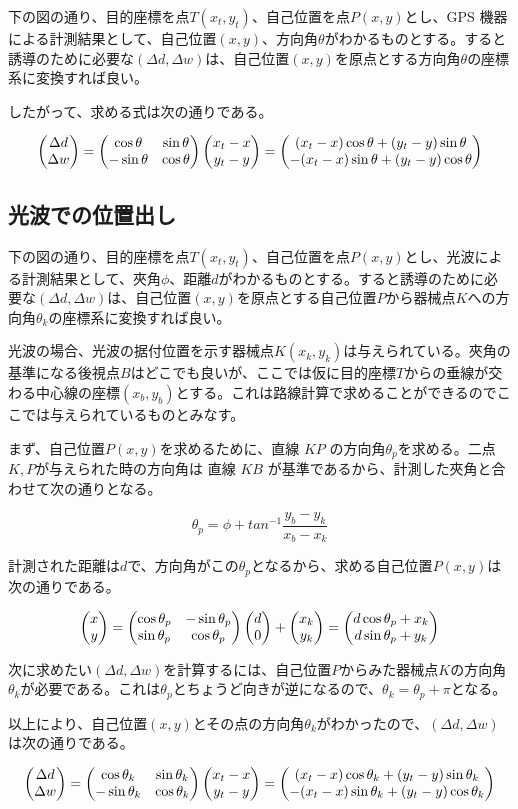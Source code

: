 下の図の通り、目的座標を点\(T(x_t, y_t)\)、自己位置を点\(P(x, y)\)とし、GPS
機器による計測結果として、自己位置\((x, y)\)、方向角\(\theta\)がわかるものとする。すると誘導のために必要な\((\Delta d,\Delta w)\)は、自己位置\((x, y)\)を原点とする方向角\(\theta\)の座標系に変換すれば良い。

したがって、求める式は次の通りである。

\[
\begin{pmatrix} \Delta d \\ \Delta w \end{pmatrix} = \begin{pmatrix} \cos\theta & \sin\theta \\ -\sin\theta & \cos\theta \end{pmatrix}\begin{pmatrix} x_t - x \\ y_t - y \end{pmatrix} = \begin{pmatrix} (x_t - x)\cos\theta + (y_t - y)\sin\theta \\ -(x_t - x)\sin\theta + (y_t - y)\cos\theta \end{pmatrix}
\]

\hypertarget{ux5149ux6ce2ux3067ux306eux4f4dux7f6eux51faux3057}{%
\subsection{光波での位置出し}\label{ux5149ux6ce2ux3067ux306eux4f4dux7f6eux51faux3057}}

下の図の通り、目的座標を点\(T(x_t, y_t)\)、自己位置を点\(P(x, y)\)とし、光波による計測結果として、夾角\(\phi\)、距離\(d\)がわかるものとする。すると誘導のために必要な\((\Delta d,\Delta w)\)は、自己位置\((x, y)\)を原点とする自己位置\(P\)から器械点\(K\)への方向角\(\theta_k\)の座標系に変換すれば良い。

光波の場合、光波の据付位置を示す器械点\(K(x_k, y_k)\)は与えられている。夾角の基準になる後視点\(B\)はどこでも良いが、ここでは仮に目的座標\(T\)からの垂線が交わる中心線の座標\((x_b, y_b)\)とする。これは路線計算で求めることができるのでここでは与えられているものとみなす。

まず、自己位置\(P(x, y)\)を求めるために、直線 \(KP\)
の方向角\(\theta_p\)を求める。二点\(K,P\)が与えられた時の方向角は 直線
\(KB\) が基準であるから、計測した夾角と合わせて次の通りとなる。

\[
 \theta_p = \phi + tan^{-1}\frac{y_b - y_k}{x_b - x_k}
\]

計測された距離は\(d\)で、方向角がこの\(\theta_p\)となるから、求める自己位置\(P(x, y)\)は次の通りである。

\[
\begin{pmatrix} x \\ y \end{pmatrix} = \begin{pmatrix} \cos\theta_p & -\sin\theta_p \\ \sin\theta_p & \cos\theta_p \end{pmatrix}\begin{pmatrix} d \\ 0 \end{pmatrix} + \begin{pmatrix} x_k \\ y_k \end{pmatrix}= \begin{pmatrix} d\cos\theta_p + x_k \\ d\sin\theta_p + y_k \end{pmatrix}
\]

次に求めたい\((\Delta d,\Delta w)\)を計算するには、自己位置\(P\)からみた器械点\(K\)の方向角\(\theta_k\)が必要である。これは\(\theta_p\)とちょうど向きが逆になるので、\(\theta_k = \theta_p + \pi\)となる。

以上により、自己位置\((x, y)\)とその点の方向角\(\theta_k\)がわかったので、\((\Delta d,\Delta w)\)は次の通りである。

\[
\begin{pmatrix} \Delta d \\ \Delta w \end{pmatrix} = \begin{pmatrix} \cos\theta_k & \sin\theta_k \\ -\sin\theta_k & \cos\theta_k \end{pmatrix}\begin{pmatrix} x_t - x \\ y_t - y \end{pmatrix} = \begin{pmatrix} (x_t - x)\cos\theta_k + (y_t - y)\sin\theta_k \\ -(x_t - x)\sin\theta_k + (y_t - y)\cos\theta_k \end{pmatrix}
\]

